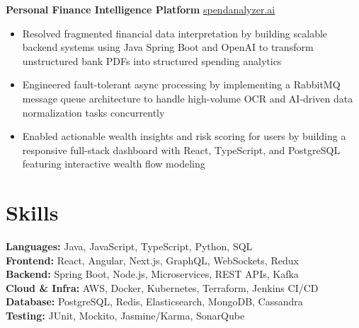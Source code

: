\documentclass[11pt]{article}
\begin{document}
\textbf{Personal Finance Intelligence Platform} \hfill \href{https://spend-analyzer-coral.vercel.app/login/demo}{spendanalyzer.ai} \\
\vspace{-9pt}
\begin{itemize}
    \item Resolved fragmented financial data interpretation by building scalable backend systems using Java Spring Boot and OpenAI to transform unstructured bank PDFs into structured spending analytics
    \item Engineered fault-tolerant async processing by implementing a RabbitMQ message queue architecture to handle high-volume OCR and AI-driven data normalization tasks concurrently
    \item Enabled actionable wealth insights and risk scoring for users by building a responsive full-stack dashboard with React, TypeScript, and PostgreSQL featuring interactive wealth flow modeling
\end{itemize}

\vspace{-18.5pt}

\section*{Skills}
\textbf{Languages:} Java, JavaScript, TypeScript, Python, SQL \\
\textbf{Frontend:} React, Angular, Next.js, GraphQL, WebSockets, Redux \\
\textbf{Backend:} Spring Boot, Node.js, Microservices, REST APIs, Kafka \\
\textbf{Cloud \& Infra:} AWS, Docker, Kubernetes, Terraform, Jenkins CI/CD \\
\textbf{Database:} PostgreSQL, Redis, Elasticsearch, MongoDB, Cassandra \\
\textbf{Testing:} JUnit, Mockito, Jasmine/Karma, SonarQube
\end{document}
